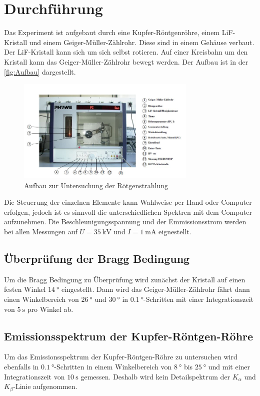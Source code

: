 \newpage
\section{Durchführung}
Das Experiment ist aufgebaut durch eine Kupfer-Röntgenröhre, einem LiF-Kristall und einem Geiger-Müller-Zählrohr. Diese sind in einem Gehäuse verbaut. Der LiF-Kristall kann sich um sich 
selbst rotieren. Auf einer Kreisbahn um den Kristall kann das Geiger-Müller-Zählrohr bewegt werden. Der Aufbau ist in der \autoref{fig:Aufbau} dargestellt.

\begin{figure}
    \centering
    \includegraphics[height=5cm]{content/mess.JPG}
    \caption{Aufbau zur Untersuchung der Rötgenstrahlung}
    \label{fig:Aufbau}
\end{figure}

\noindent
Die Steuerung der einzelnen Elemente kann Wahlweise per Hand oder Computer erfolgen, jedoch ist es sinnvoll die unterschiedlichen Spektren mit dem Computer aufzunehmen. Die Beschleunigungsspannung
und der Emmissionsstrom werden bei allen Messungen auf $U = \SI{35}{\kilo\volt}$ und $I = \SI{1}{\milli\ampere}$ eignestellt.

\subsection{Überprüfung der Bragg Bedingung}
Um die Bragg Bedingung zu Überprüfung wird zunächst der Kristall auf einen festen Winkel $\SI{14}{\degree}$ eingestellt. Dann wird das Geiger-Müller-Zählrohr fährt dann einen Winkelbereich
von $\SI{26}{\degree}$ und $\SI{30}{\degree}$ in $\SI{0.1}{\degree}$-Schritten mit einer Integrationszeit von $\SI{5}{\second}$ pro Winkel ab.

\subsection{Emissionsspektrum der Kupfer-Röntgen-Röhre}
\label{sub:emilit}
Um das Emissionsspektrum der Kupfer-Röntgen-Röhre zu untersuchen wird ebenfalls in $\SI{0.1}{\degree}$-Schritten in einem Winkelbereich von $\SI{8}{\degree}$ bis $\SI{25}{\degree}$
und mit einer Integrationszeit von $\SI{10}{\second}$ gemessen.
Deshalb wird kein Detailspektrum der $K_\alpha$ und $K_\beta$-Linie aufgenommen. 

